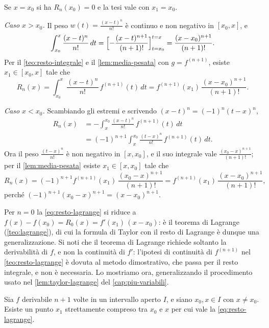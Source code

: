 \begin{dimostrazione}
Se $x=x_{0}$ si ha $R_{n}(x_{0})=0$ e la tesi vale con $x_{1}=x_{0}$.

\emph{Caso $x>x_{0}$.} Il peso $w(t)=\frac{(x-t)^{n}}{n!}$ è continuo e non negativo in
$[x_{0},x]$, e
\begin{equation}\label{eq:integrale-peso}
  \int_{x_{0}}^{x}\frac{(x-t)^{n}}{n!}\,dt=\Bigl[-\frac{(x-t)^{n+1}}{(n+1)!}\Bigr]_{t=x_{0}}^{t=x}
  =\frac{(x-x_{0})^{n+1}}{(n+1)!} .
\end{equation}
Per il \cref{teo:resto-integrale} e il \cref{lem:media-pesata} con $g=f^{(n+1)}$, esiste
$x_{1}\in[x_{0},x]$ tale che
\[
  R_{n}(x)=\int_{x_{0}}^{x}\frac{(x-t)^{n}}{n!}\,f^{(n+1)}(t)\,dt
  =f^{(n+1)}(x_{1})\,\frac{(x-x_{0})^{n+1}}{(n+1)!} .
\]

\emph{Caso $x<x_{0}$.} Scambiando gli estremi e scrivendo $(x-t)^{n}=(-1)^{n}(t-x)^{n}$,
\[
\begin{aligned}
  R_{n}(x)&=-\int_{x}^{x_{0}}\frac{(x-t)^{n}}{n!}\,f^{(n+1)}(t)\,dt\\
  &=(-1)^{n+1}\int_{x}^{x_{0}}\frac{(t-x)^{n}}{n!}\,f^{(n+1)}(t)\,dt .
\end{aligned}
\]
Ora il peso $\frac{(t-x)^{n}}{n!}$ è non negativo in $[x,x_{0}]$, e il suo integrale vale
$\frac{(x_{0}-x)^{n+1}}{(n+1)!}$; per il \cref{lem:media-pesata} esiste $x_{1}\in[x,x_{0}]$ tale che
\[
  R_{n}(x)=(-1)^{n+1}f^{(n+1)}(x_{1})\,\frac{(x_{0}-x)^{n+1}}{(n+1)!}
  =f^{(n+1)}(x_{1})\,\frac{(x-x_{0})^{n+1}}{(n+1)!} ,
\]
perché $(-1)^{n+1}(x_{0}-x)^{n+1}=(x-x_{0})^{n+1}$.
\end{dimostrazione}

\begin{osservazione}\label{oss:lagrange-n0}
Per $n=0$ la \eqref{eq:resto-lagrange} si riduce a
$f(x)-f(x_{0})=R_{0}(x)=f'(x_{1})\,(x-x_{0})$: è il teorema di Lagrange
(\cref{teo:lagrange}), di cui la formula di Taylor con il resto di Lagrange è dunque
una generalizzazione. Si noti che il teorema di Lagrange richiede soltanto la
derivabilità di $f$, e non la continuità di $f'$: l'ipotesi di continuità di $f^{(n+1)}$
nel \cref{teo:resto-lagrange} è dovuta al metodo dimostrativo, che passa per il resto
integrale, e non è necessaria. Lo mostriamo ora, generalizzando il procedimento usato
nel \cref{lem:taylor-lagrange} del \cref{cap:piu-variabili}.
\end{osservazione}

\begin{teorema}\label{teo:resto-lagrange-generale}
Sia $f$ derivabile $n+1$ volte in un intervallo aperto $I$, e siano $x_{0},x\in I$ con
$x\neq x_{0}$. Esiste un punto $x_{1}$ strettamente compreso tra $x_{0}$ e $x$ per cui vale la
\eqref{eq:resto-lagrange}.
\end{teorema}


